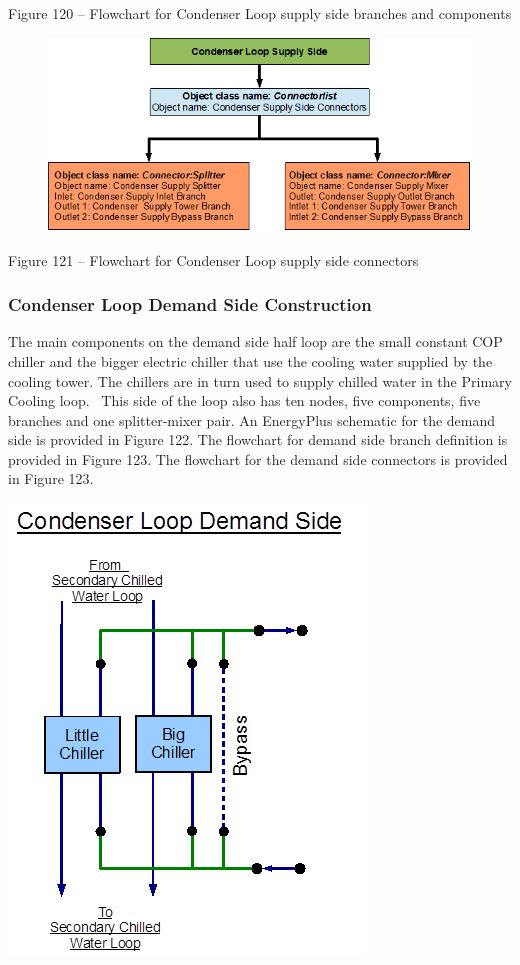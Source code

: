 Figure 120 -- Flowchart for Condenser Loop supply side branches and components

\begin{figure}[htbp]
\centering
\includegraphics{media/image121.png}
\caption{}
\end{figure}

Figure 121 -- Flowchart for Condenser Loop supply side connectors

\subsubsection{Condenser Loop Demand Side Construction}\label{condenser-loop-demand-side-construction-000}

The main components on the demand side half loop are the small constant COP chiller and the bigger electric chiller that use the cooling water supplied by the cooling tower. The chillers are in turn used to supply chilled water in the Primary Cooling loop. ~This side of the loop also has ten nodes, five components, five branches and one splitter-mixer pair. An EnergyPlus schematic for the demand side is provided in Figure 122. The flowchart for demand side branch definition is provided in Figure 123. The flowchart for the demand side connectors is provided in Figure 123.

\textbf{\includegraphics{media/image122.png}}

